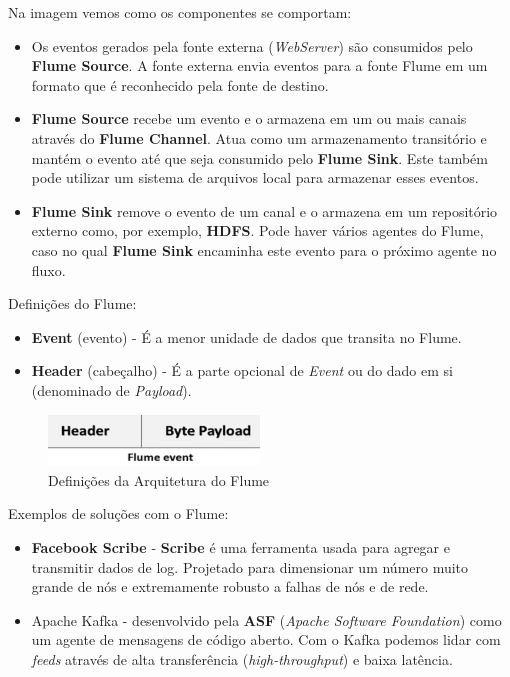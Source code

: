 \documentclass[a4paper,11pt]{article}
\begin{document}
Na imagem vemos como os componentes se comportam: \vspace{-1em}
\begin{itemize}
	\item Os eventos gerados pela fonte externa (\textit{WebServer}) são consumidos pelo \textbf{Flume Source}. A fonte externa envia eventos para a fonte Flume em um formato que é reconhecido pela fonte de destino.
	\item \textbf{Flume Source} recebe um evento e o armazena em um ou mais canais através do \textbf{Flume Channel}. Atua como um armazenamento transitório e mantém o evento até que seja consumido pelo \textbf{Flume Sink}. Este também pode utilizar um sistema de arquivos local para armazenar esses eventos.
	\item \textbf{Flume Sink} remove o evento de um canal e o armazena em um repositório externo como, por exemplo, \textbf{HDFS}. Pode haver vários agentes do Flume, caso no qual \textbf{Flume Sink} encaminha este evento para o próximo agente no fluxo.
\end{itemize}

Definições do Flume: \vspace{-1em}
\begin{itemize}
	\item \textbf{Event} (evento) - É a menor unidade de dados que transita no Flume.
	\item \textbf{Header} (cabeçalho) - É a parte opcional de \textit{Event} ou do dado em si (denominado de \textit{Payload}).
\end{itemize}
\begin{figure}[H]
	\centering
	\includegraphics[width=0.5\textwidth]{imagem/event}
	\caption{Definições da Arquitetura do Flume}
\end{figure}

Exemplos de soluções com o Flume: \vspace{-1em}
\begin{itemize}
	\item \textbf{Facebook Scribe} - \textbf{Scribe} é uma ferramenta usada para agregar e transmitir dados de log. Projetado para dimensionar um número muito grande de nós e extremamente robusto a falhas de nós e de rede.
	\item Apache Kafka - desenvolvido pela \textbf{ASF} (\textit{Apache Software Foundation}) como um agente de mensagens de código aberto. Com o Kafka podemos lidar com \textit{feeds} através de alta transferência (\textit{high-throughput}) e baixa latência.
\end{itemize}
\end{document}
